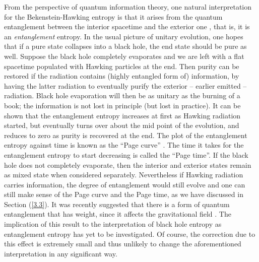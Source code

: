 \documentclass[12pt]{article}
\newcommand{\2}{$^2$}
\newcommand{\3}{$^3$}
\newcommand{\4}{$_4$}
\newcommand{\5}{$_5$}
\begin{document}
From the perspective of quantum information theory, one natural interpretation for the Bekenstein-Hawking entropy is that it arises from the quantum entanglement between the interior spacetime and the exterior one \cite{9404039}, that is, it is an \emph{entanglement} entropy. In the usual picture of unitary evolution, one hopes that if a pure state collapses into a black hole, the end state should be pure as well. 
Suppose the black hole completely evaporates and we are left with a flat spacetime populated with Hawking particles at the end. Then purity can be restored if the radiation contains (highly entangled form of) information, by having the latter radiation to eventually purify the exterior -- earlier emitted -- radiation. Black hole evaporation will then be as unitary as the burning of a book; the information is not lost in principle (but lost in practice). It can be shown that the entanglement entropy increases at first as Hawking radiation started, but eventually turns over about the mid point of the evolution, and reduces to zero as purity is recovered at the end. The plot of the entanglement entropy against time is known as the ``Page curve'' \cite{page1, page2}. The time it takes for the entanglement entropy to start decreasing is called the ``Page time''. If the black hole does not completely evaporate, then the interior and exterior states remain as mixed state when considered separately. Nevertheless if Hawking radiation carries information, the degree of entanglement would still evolve and one can still make sense of the Page curve and the Page time, as we have discussed in Section (\ref{3.3}). It was recently suggested that there is a form of quantum entanglement that has weight, since it affects the gravitational field \cite{DEB}. The implication of this result to the interpretation of black hole entropy as entanglement entropy has yet to be investigated. Of course, the correction due to this effect is extremely small and thus unlikely to change the aforementioned interpretation in any significant way. 
\end{document}
